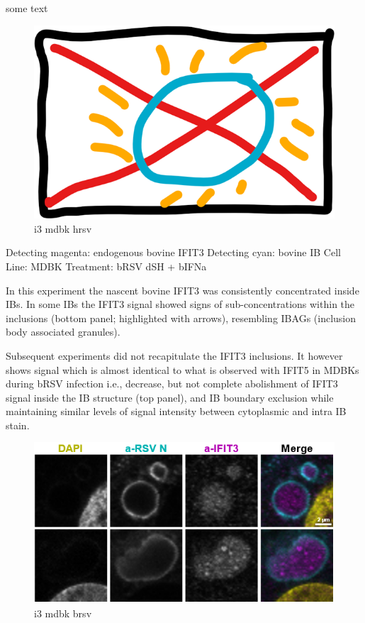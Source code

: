 \label{bIFIT3 Localisation During h/bRSV Infection}
some text

\begin{figure}
    \centering
    \includegraphics[width=0.5\linewidth]{06. Chapter 1//Figs/00. placeholder.png}
    \caption[i3 mdbk hrsv]{i3 mdbk hrsv}
    \label{fig:i3 mdbk hrsv}
\end{figure}

Detecting magenta: endogenous bovine IFIT3 \newline
Detecting cyan: bovine IB \newline
Cell Line: MDBK \newline
Treatment: bRSV dSH + bIFNa \newline

In this experiment the nascent bovine IFIT3 was consistently concentrated inside IBs. In some IBs the IFIT3 signal showed signs of sub-concentrations within the inclusions (bottom panel; highlighted with arrows), resembling IBAGs (inclusion body associated granules).

Subsequent experiments did not recapitulate the IFIT3 inclusions. It however shows signal which is almost identical to what is observed with IFIT5 in MDBKs during bRSV infection i.e., decrease, but not complete abolishment of IFIT3 signal inside the IB structure (top panel), and IB boundary exclusion while maintaining similar levels of signal intensity between cytoplasmic and intra IB stain.

\begin{figure}
    \centering
    \includegraphics[width=1\linewidth]{09. Chapter 4/Figs/04. IFIT3/04. mdbk brsv.png}
    \caption[i3 mdbk brsv]{i3 mdbk brsv}
    \label{fig:i3 mdbk brsv}
\end{figure}



